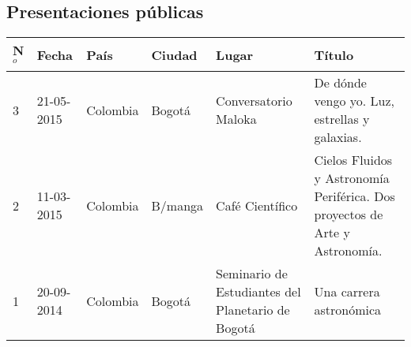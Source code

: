 \documentclass{article}
\begin{document}
\subsection{Presentaciones p\'ublicas}

\begin{tabular}{l l l l p{3cm} p{4cm}}\hline
N$^{o}$ & Fecha & Pa\'is & Ciudad & Lugar & T\'itulo\\\hline
3 & 21-05-2015 & Colombia & Bogot\'a & Conversatorio Maloka & De d\'onde vengo yo. Luz, estrellas y galaxias.\\
2 & 11-03-2015 & Colombia & B/manga & Caf\'e Cient\'ifico & Cielos Fluidos y Astronom\'ia Perif\'erica. Dos proyectos de Arte y Astronom\'ia.\\
1 & 20-09-2014 & Colombia & Bogot\'a & Seminario de Estudiantes del
Planetario de Bogot\'a& Una carrera astron\'omica \\\hline
\end{tabular}
\end{document}
